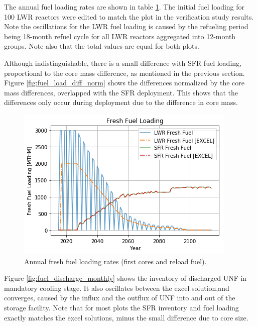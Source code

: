 The annual fuel loading rates are shown in table \ref{fig:fuel_load}.
The initial fuel loading for 100 \gls{LWR} reactors were edited to match
the plot in the verification
study results. Note the oscillations for the \gls{LWR} fuel loading
is caused by the refueling period being 18-month refuel cycle for all \gls{LWR} reactors
aggregated into 12-month groups. Note also that the total values
are equal for both plots.

Although indistinguishable,
there is a small difference with \gls{SFR} fuel loading, proportional
to the core mass difference, as mentioned in the previous section.
Figure \ref{fig:fuel_load_diff_norm} shows the
differences normalized by the core mass differences, overlapped with the
\gls{SFR} deployment. This shows that the differences only occur during
deployment due to the difference in core mass.


\begin{figure}[htbp!]
    \begin{center}
        \includegraphics[scale=0.5]{./images/results_18/fuel_load.png}
    \end{center}
        \caption{Annual fresh fuel loading rates (first cores and reload fuel).}
    \label{fig:fuel_load}
\end{figure}

Figure \ref{fig:fuel_discharge_monthly} shows the inventory of discharged
\gls{UNF} in mandatory cooling stage. It also oscillates between the excel 
solution,and converges, caused by the influx and the outflux of \gls{UNF}
into and out of the storage facility.
Note that for most plots the \gls{SFR} inventory and fuel loading
exactly matches the excel solutions, minus the small difference due to core
size.

